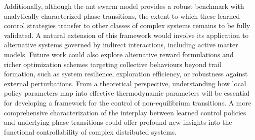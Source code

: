 \documentclass[openacc]{rsproca_new}
\begin{document}
Additionally, although the ant swarm model provides a robust benchmark with analytically characterized phase transitions, the extent to which these learned control strategies transfer to other classes of complex systems remains to be fully validated. A natural extension of this framework would involve its application to alternative systems governed by indirect interactions, including active matter models. Future work could also explore alternative reward formulations and richer optimization schemes targeting collective behaviours beyond trail formation, such as system resilience, exploration efficiency, or robustness against external perturbations. From a theoretical perspective, understanding how local policy parameters map into effective thermodynamic parameters will be essential for developing a framework for the control of non-equilibrium transitions. A more comprehensive characterization of the interplay between learned control policies and underlying phase transitions could offer profound new insights into the functional controllability of complex distributed systems.

\end{document}
